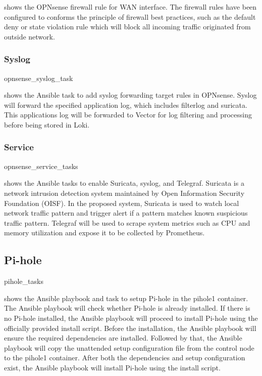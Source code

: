 \documentclass[../index.tex]{subfiles}
\begin{document}
 shows the OPNsense firewall rule for WAN interface. The firewall rules have
been configured to conforms the principle of firewall best practices, such as the default deny or
state violation rule which will block all incoming traffic originated from outside network.

\subsubsection{Syslog}

{opnsense_syslog_task}

 shows the Ansible task to add syslog forwarding target rules in
OPNsense. Syslog will forward the specified application log, which includes filterlog and suricata.
This applications log will be forwarded to Vector for log filtering and processing before being
stored in Loki.

\subsubsection{Service}

{opnsense_service_tasks}

 shows the Ansible tasks to enable Suricata, syslog, and Telegraf.
Suricata is a network intrusion detection system maintained by Open Information Security Foundation
(OISF). In the proposed system, Suricata is used to watch local network traffic pattern and trigger
alert if a pattern matches known suspicious traffic pattern. Telegraf will be used to scrape system
metrics such as CPU and memory utilization and expose it to be collected by Prometheus.

\subsection{Pi-hole}


{pihole_tasks}

 shows the Ansible playbook and task to setup Pi-hole in
the pihole1 container. The Ansible playbook will check whether Pi-hole is already installed. If
there is no Pi-hole installed, the Ansible playbook will proceed to install Pi-hole using the
officially provided install script. Before the installation, the Ansible playbook will ensure the
required dependencies are installed. Followed by that, the Ansible playbook will copy the unattended
setup configuration file from the control node to the pihole1 container. After both the dependencies
and setup configuration exist, the Ansible playbook will install Pi-hole using the install script.
\end{document}
